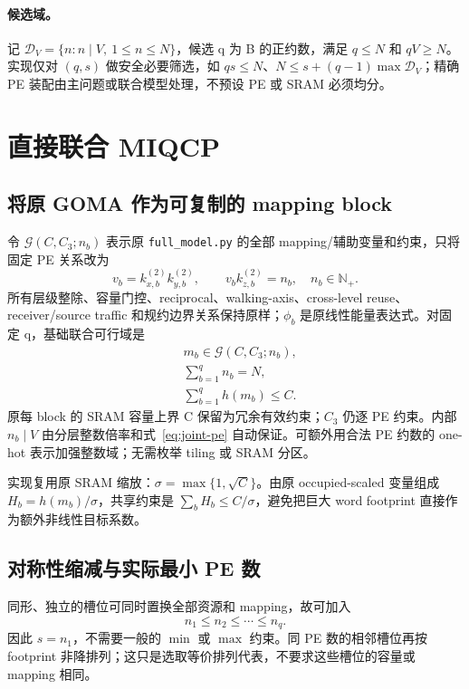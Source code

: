 \documentclass[UTF8,11pt,a4paper,fontset=fandol]{ctexart}
\newcommand{\NN}{\mathbb N}
\theoremstyle{remark}\newtheorem{remark}[proposition]{说明}
\numberwithin{equation}{section}
\begin{document}
\paragraph{候选域。}
记 $\mathcal D_V=\{n:n\mid V,\ 1\le n\le N\}$，候选 q 为 B 的正约数，满足 $q\le N$ 和 $qV\ge N$。实现仅对 $(q,s)$ 做安全必要筛选，如 $qs\le N$、$N\le s+(q-1)\max\mathcal D_V$；精确 PE 装配由主问题或联合模型处理，不预设 PE 或 SRAM 必须均分。

\section{直接联合 MIQCP}
\label{sec:joint}
\subsection{将原 GOMA 作为可复制的 mapping block}
令 $\mathcal G(C,C_3;n_b)$ 表示原 \texttt{full\_model.py} 的全部 mapping/辅助变量和约束，只将固定 PE 关系改为
\begin{equation}
v_b=k_{x,b}^{(2)}k_{y,b}^{(2)},\qquad
v_bk_{z,b}^{(2)}=n_b,\quad n_b\in\NN_+.
\label{eq:joint-pe}
\end{equation}
所有层级整除、容量门控、reciprocal、walking-axis、cross-level reuse、receiver/source traffic 和规约边界关系保持原样；$\phi_b$ 是原线性能量表达式。对固定 q，基础联合可行域是
\begin{equation}
\begin{aligned}
&m_b\in\mathcal G(C,C_3;n_b),\\
&\sum_{b=1}^q n_b=N,\\
&\sum_{b=1}^q h(m_b)\le C.
\end{aligned}
\label{eq:joint-base}
\end{equation}
原每 block 的 SRAM 容量上界 C 保留为冗余有效约束；$C_3$ 仍逐 PE 约束。内部 $n_b\mid V$ 由分层整数倍率和式~\eqref{eq:joint-pe} 自动保证。可额外用合法 PE 约数的 one-hot 表示加强整数域；无需枚举 tiling 或 SRAM 分区。

实现复用原 SRAM 缩放：$\sigma=\max\{1,\sqrt C\}$。由原 occupied-scaled 变量组成 $H_b=h(m_b)/\sigma$，共享约束是 $\sum_bH_b\le C/\sigma$，避免把巨大 word footprint 直接作为额外非线性目标系数。

\subsection{对称性缩减与实际最小 PE 数}
同形、独立的槽位可同时置换全部资源和 mapping，故可加入
\begin{equation}
n_1\le n_2\le\cdots\le n_q.
\label{eq:sort}
\end{equation}
因此 $s=n_1$，不需要一般的 $\min$ 或 $\max$ 约束。同 PE 数的相邻槽位再按 footprint 非降排列；这只是选取等价排列代表，不要求这些槽位的容量或 mapping 相同。
\end{document}
